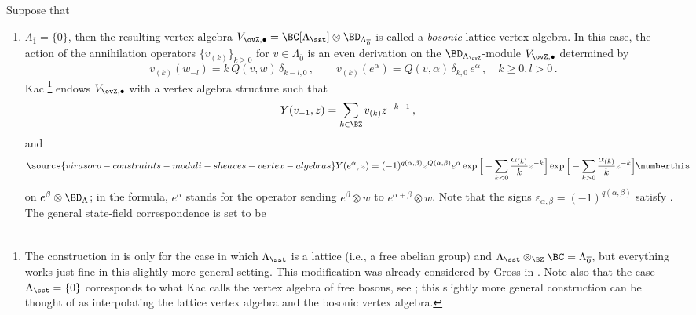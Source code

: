 \begin{definition}
\notready
\label{Def: latticeVA}
    Suppose that
    \begin{enumerate}
        \item     $\Lambda_{\overline{1}} = \{0\}$, then the resulting vertex algebra $V_{\ovZ,\bullet}=\BC[\Lambda_\sst]\otimes \BD_{\Lambda_{\overline 0}}$ is called a \textit{bosonic} lattice vertex algebra. In this case,  the action of the annihilation operators $\{v_{(k)}\}_{k\geq 0}$ for $v\in \Lambda_{\overline 0}$ is an even derivation on the $\BD_{\Lambda_{\ovZ}}$-module $V_{\ovZ,\bullet}$ determined by
$$
v_{(k)}(w_{-l}) = k\,Q(v,w)\,\delta_{k-l,0}\,,\qquad v_{(k)}(e^\alpha) = Q(v,\alpha)\,\delta_{k,0}\,e^\alpha\,, \quad k\geq 0, l>0 \,.
$$
Kac \cite[Section 5.5]{Ka98}\footnote{\label{footnote: kac}The construction in \cite[Section 5.4]{Ka98} is only for the case in which $\Lambda_\sst$ is a lattice (i.e., a free abelian group) and $\Lambda_\sst\otimes_\BZ \BC=\Lambda_{\overline 0}$, but everything works just fine in this slightly more general setting. This modification was already considered by Gross in \cite[Definition 3.5]{Gr19}. Note also that the case $\Lambda_\sst=\{0\}$ corresponds to what Kac calls the vertex algebra of free bosons, see \cite[Section 3.5]{Ka98}; this slightly more general construction can be thought of as interpolating the lattice vertex algebra and the bosonic vertex algebra.} endows $V_{\ovZ,\bullet}$ with a vertex algebra structure such that
\begin{align*}
    Y(v_{-1},z) &= \sum_{k\in \BZ}v_{(k)}z^{-k-1}\,,
\end{align*}
and
\begin{align*}
   \label{Eq: field2}
\source{virasoro-constraints-moduli-sheaves-vertex-algebras}
 Y(e^{\alpha},z) &= (-1)^{q(\alpha, \beta)}z^{Q(\alpha,\beta)}e^{\alpha} \exp\Big[-\sum_{ k<0}\frac{\alpha_{(k)}}{k}z^{-k}\Big]\exp\Big[-\sum_{k>0}\frac{\alpha_{(k)}}{k}z^{-k}\Big]
 \numberthis
\end{align*}
on $e^\beta\otimes \BD_{\Lambda}$; in the formula, $e^\alpha$ stands for the operator sending $e^\beta\otimes w$ to $e^{\alpha+\beta}\otimes w$. Note that the signs $\varepsilon_{\alpha, \beta}=(-1)^{q(\alpha, \beta)}$ satisfy \cite[Equations 5.4.14]{Ka98}. The general state-field correspondence is set to be
     \begin{multline}\label{Eq: reconstruction}

\end{multline}
\end{enumerate}
\end{definition}

